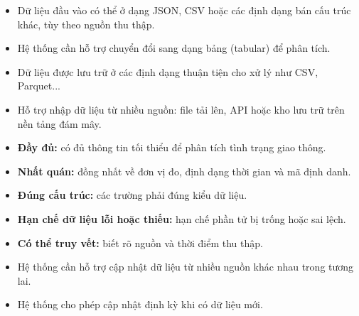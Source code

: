 \begin{itemize}
    \item Dữ liệu đầu vào có thể ở dạng JSON, CSV hoặc các định dạng bán cấu trúc khác, tùy theo nguồn thu thập.
    \item Hệ thống cần hỗ trợ chuyển đổi sang dạng bảng (tabular) để phân tích.
    \item Dữ liệu được lưu trữ ở các định dạng thuận tiện cho xử lý như CSV, Parquet...
    \item Hỗ trợ nhập dữ liệu từ nhiều nguồn: file tải lên, API hoặc kho lưu trữ trên nền tảng đám mây.
\end{itemize}

\begin{itemize}
    \item \textbf{Đầy đủ:} có đủ thông tin tối thiểu để phân tích tình trạng giao thông.
    \item \textbf{Nhất quán:} đồng nhất về đơn vị đo, định dạng thời gian và mã định danh.
    \item \textbf{Đúng cấu trúc:} các trường phải đúng kiểu dữ liệu.
    \item \textbf{Hạn chế dữ liệu lỗi hoặc thiếu:} hạn chế phần tử bị trống hoặc sai lệch.
    \item \textbf{Có thể truy vết:} biết rõ nguồn và thời điểm thu thập.
\end{itemize}

\begin{itemize}
    \item Hệ thống cần hỗ trợ cập nhật dữ liệu từ nhiều nguồn khác nhau trong tương lai.
    \item Hệ thống cho phép cập nhật định kỳ khi có dữ liệu mới.
\end{itemize}